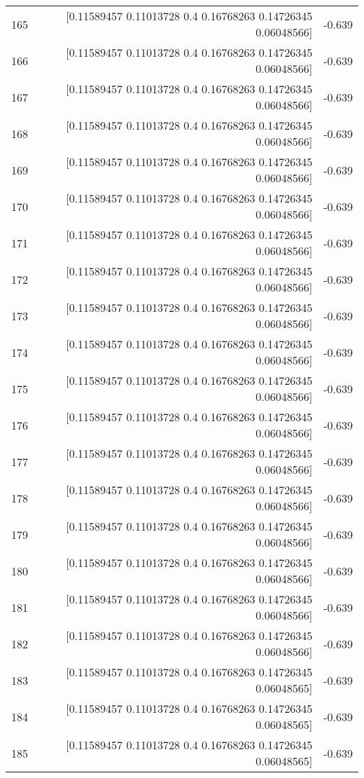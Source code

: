 \begin{longtable}{lrr}
165 & [0.11589457 0.11013728 0.4        0.16768263 0.14726345 0.06048566] & -0.639 \\
166 & [0.11589457 0.11013728 0.4        0.16768263 0.14726345 0.06048566] & -0.639 \\
167 & [0.11589457 0.11013728 0.4        0.16768263 0.14726345 0.06048566] & -0.639 \\
168 & [0.11589457 0.11013728 0.4        0.16768263 0.14726345 0.06048566] & -0.639 \\
169 & [0.11589457 0.11013728 0.4        0.16768263 0.14726345 0.06048566] & -0.639 \\
170 & [0.11589457 0.11013728 0.4        0.16768263 0.14726345 0.06048566] & -0.639 \\
171 & [0.11589457 0.11013728 0.4        0.16768263 0.14726345 0.06048566] & -0.639 \\
172 & [0.11589457 0.11013728 0.4        0.16768263 0.14726345 0.06048566] & -0.639 \\
173 & [0.11589457 0.11013728 0.4        0.16768263 0.14726345 0.06048566] & -0.639 \\
174 & [0.11589457 0.11013728 0.4        0.16768263 0.14726345 0.06048566] & -0.639 \\
175 & [0.11589457 0.11013728 0.4        0.16768263 0.14726345 0.06048566] & -0.639 \\
176 & [0.11589457 0.11013728 0.4        0.16768263 0.14726345 0.06048566] & -0.639 \\
177 & [0.11589457 0.11013728 0.4        0.16768263 0.14726345 0.06048566] & -0.639 \\
178 & [0.11589457 0.11013728 0.4        0.16768263 0.14726345 0.06048566] & -0.639 \\
179 & [0.11589457 0.11013728 0.4        0.16768263 0.14726345 0.06048566] & -0.639 \\
180 & [0.11589457 0.11013728 0.4        0.16768263 0.14726345 0.06048566] & -0.639 \\
181 & [0.11589457 0.11013728 0.4        0.16768263 0.14726345 0.06048566] & -0.639 \\
182 & [0.11589457 0.11013728 0.4        0.16768263 0.14726345 0.06048566] & -0.639 \\
183 & [0.11589457 0.11013728 0.4        0.16768263 0.14726345 0.06048565] & -0.639 \\
184 & [0.11589457 0.11013728 0.4        0.16768263 0.14726345 0.06048565] & -0.639 \\
185 & [0.11589457 0.11013728 0.4        0.16768263 0.14726345 0.06048565] & -0.639 \\

\end{longtable}
